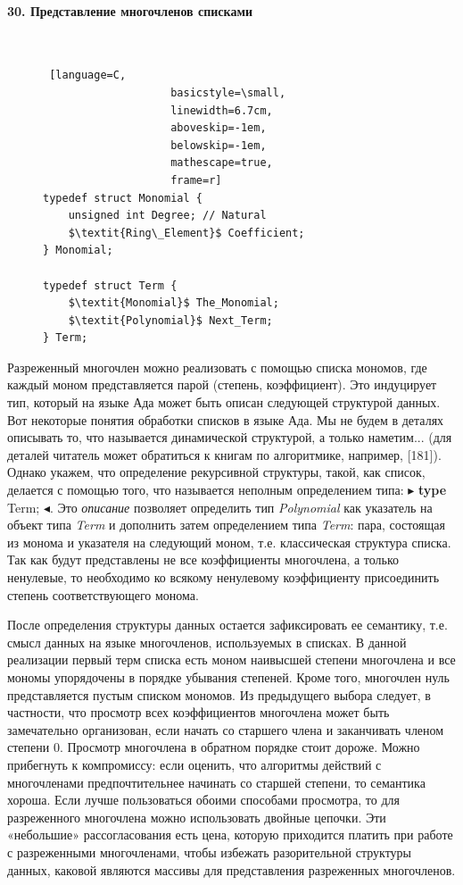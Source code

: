 \documentclass{../../template/mai_book}
\begin{document}
\newpage


\paragraph{30. Представление многочленов списками} \mbox{}\\

\begin{figure}
\begin{lstlisting} [language=C,
					basicstyle=\small,
					linewidth=6.7cm,
					aboveskip=-1em,
					belowskip=-1em,
					mathescape=true,
					frame=r]
typedef struct Monomial {
	unsigned int Degree; // Natural
	$\textit{Ring\_Element}$ Coefficient;
} Monomial;

typedef struct Term {
	$\textit{Monomial}$ The_Monomial;
	$\textit{Polynomial}$ Next_Term;
} Term;
\end{lstlisting}
\end{figure}

Разреженный многочлен можно реализовать с помощью списка мономов, где каждый моном представляется парой (степень, коэффициент). Это индуцирует тип, который на языке Ада может быть описан следующей структурой данных. Вот некоторые понятия обработки списков в языке Ада. Мы не будем в деталях описывать то, что называется динамической структурой, а только наметим... (для деталей читатель может обратиться к книгам по алгоритмике, например, [181]). Однако укажем, что определение рекурсивной структуры, такой, как список, делается с помощью того, что называется неполным определением типа: $\blacktriangleright$ \textbf{type} Term; $\blacktriangleleft$. Это \textit{описание} позволяет определить тип \textit{Polynomial} как указатель на объект типа \textit{Term} и дополнить затем определением типа \textit{Term}: пара, состоящая из монома и указателя на следующий моном, т.е. классическая структура списка. Так как будут представлены не все коэффициенты многочлена, а только ненулевые, то необходимо ко всякому ненулевому коэффициенту присоединить степень соответствующего монома.

После определения структуры данных остается зафиксировать ее семантику, т.е. смысл данных на языке многочленов, используемых в списках. В данной реализации первый терм списка есть моном наивысшей степени многочлена и все мономы упорядочены в порядке убывания степеней. Кроме того, многочлен нуль представляется пустым списком мономов. Из предыдущего выбора следует, в частности, что просмотр всех коэффициентов многочлена может быть замечательно организован, если начать со старшего члена и заканчивать членом степени 0. Просмотр многочлена в обратном порядке стоит дороже. Можно прибегнуть к компромиссу: если оценить, что алгоритмы действий с многочленами предпочтительнее начинать со старшей степени, то семантика хороша. Если лучше пользоваться обоими способами просмотра, то для разреженного многочлена можно использовать двойные цепочки. Эти «небольшие» рассогласования есть цена, которую приходится платить при работе с разреженными многочленами, чтобы избежать разорительной структуры данных, каковой являются массивы для представления разреженных многочленов.
\end{document}
